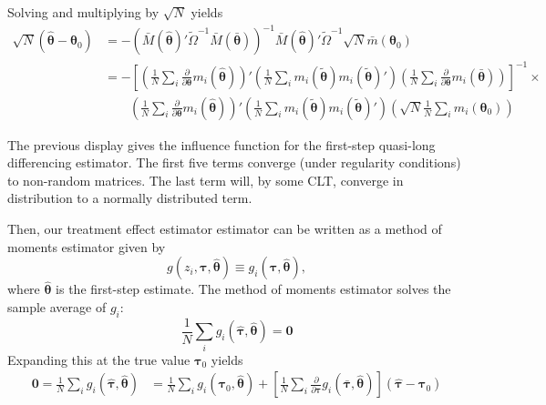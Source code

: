\documentclass[12pt]{article}
\begin{document}
Solving and multiplying by $\sqrt{N}$ yields
\begin{align*}
  \sqrt{N}\left( \hat{\bm{\theta}} - \bm{\theta}_0 \right) &=
  - \left( \bar{M}(\hat{\bm{\theta}})' \tilde{\Omega}^{-1} \bar{M}(\bar{\bm{\theta}}) \right)^{-1} \bar{M}(\hat{\bm{\theta}})' \tilde{\Omega}^{-1} \sqrt{N} \bar{m}(\bm{\theta}_0) \\
  &= - \left[ 
    \left(\frac{1}{N} \sum_i \frac{\partial}{\partial \bm{\theta}} m_i(\hat{\bm{\theta}}) \right)' 
    \left( \frac{1}{N} \sum_i m_i(\tilde{\bm{\theta}}) m_i(\tilde{\bm{\theta}})' \right)
    \left(\frac{1}{N} \sum_i \frac{\partial}{\partial \bm{\theta}} m_i(\bar{\bm{\theta}}) \right) 
  \right]^{-1} \times \\
  &\qquad \left(\frac{1}{N} \sum_i \frac{\partial}{\partial \bm{\theta}} m_i(\hat{\bm{\theta}}) \right)' 
  \left( \frac{1}{N} \sum_i m_i(\tilde{\bm{\theta}}) m_i(\tilde{\bm{\theta}})' \right) 
  \left(\sqrt{N} \frac{1}{N} \sum_i m_i(\bm{\theta}_0) \right)
\end{align*}

The previous display gives the influence function for the first-step quasi-long differencing estimator. The first five terms converge (under regularity conditions) to non-random matrices. The last term will, by some CLT, converge in distribution to a normally distributed term.

\bigskip\bigskip
Then, our treatment effect estimator estimator can be written as a method of moments estimator given by 
$$
  g(z_i, \bm{\tau}, \hat{\bm{\theta}}) \equiv g_i(\bm{\tau}, \hat{\bm{\theta}}),
$$
where $\hat{\bm{\theta}}$ is the first-step estimate. 
The method of moments estimator solves the sample average of $g_i$:
$$
  \frac{1}{N} \sum_i g_i(\hat{\bm{\tau}}, \hat{\bm{\theta}}) = \bm{0}
$$
Expanding this at the true value $\bm{\tau}_0$ yields
\begin{align*}
  \bm{0} = \frac{1}{N} \sum_i g_i(\hat{\bm{\tau}}, \hat{\bm{\theta}}) &= 
  \frac{1}{N} \sum_i g_i(\bm{\tau}_0, \hat{\bm{\theta}}) +
  \left[ \frac{1}{N} \sum_i \frac{\partial}{\partial \bm{\tau}} g_i(\bar{\bm{\tau}}, \hat{\bm{\theta}}) \right] (\hat{\bm{\tau}} - \bm{\tau}_0)
\end{align*}
\end{document}
